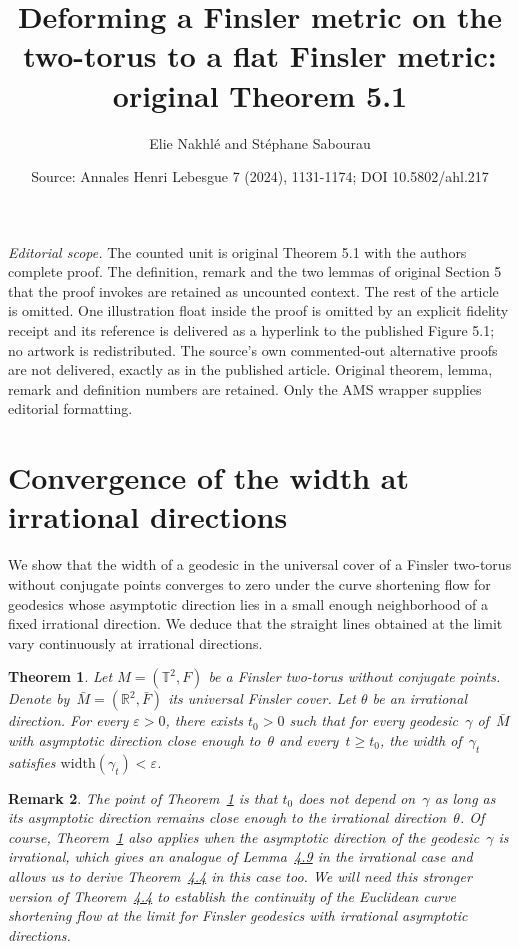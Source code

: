\documentclass[10pt,a4paper]{amsart}
\title[Uniform width convergence at irrational directions]{Deforming a Finsler metric on the two-torus to a flat Finsler metric: original Theorem 5.1}
\author{Elie Nakhlé and Stéphane Sabourau}
\date{Source: Annales Henri Lebesgue 7 (2024), 1131-1174; DOI 10.5802/ahl.217}
\numberwithin{equation}{section}
\newcommand{\R}{\mathbb{R}}
\newcommand{\T}{\mathbb{T}}
\newcommand{\width}{\mathrm{width}}
\newtheorem{theo}{Theorem}[section]
\newtheorem{rema}[theo]{Remark}
\begin{document}
\maketitle
\noindent\textit{Editorial scope.} The counted unit is original Theorem 5.1 with the authors complete proof. The definition, remark and the two lemmas of original Section 5 that the proof invokes are retained as uncounted context. The rest of the article is omitted. One illustration float inside the proof is omitted by an explicit fidelity receipt and its reference is delivered as a hyperlink to the published Figure 5.1; no artwork is redistributed. The source's own commented-out alternative proofs are not delivered, exactly as in the published article. Original theorem, lemma, remark and definition numbers are retained. Only the AMS wrapper supplies editorial formatting.
\setcounter{section}{4}
\section{Convergence of the width at irrational directions} \label{sec:uniform}


We show that the width of a geodesic in the universal cover of a Finsler two-torus without conjugate points converges to zero under the curve shortening flow for geodesics whose asymptotic direction lies in a small enough neighborhood of a fixed irrational direction. We deduce that the straight lines obtained at the limit vary continuously at irrational directions.



\begin{theo}\label{theo:unifwidth}
Let $M=(\T^2,F)$ be a Finsler two-torus without conjugate points. Denote by~$\bar{M}=(\R^2,\bar{F})$ its universal Finsler cover. Let $\theta$ be an irrational direction. For every $\varepsilon>0$, there exists $t_0>0$ such that for every geodesic~$\gamma$ of~$\bar{M}$ with asymptotic direction close enough to~$\theta$ and every~$t \geq t_0$, the width of~$\gamma_t$ satisfies $\width(\gamma_t) < \varepsilon$.
\end{theo}

\begin{rema}
The point of Theorem~\ref{theo:unifwidth} is that $t_0$ does not depend on~$\gamma$ as long as its asymptotic direction remains close enough to the irrational direction~$\theta$. Of course, Theorem~\ref{theo:unifwidth} also applies when the asymptotic direction of the geodesic~$\gamma$ is irrational, which gives an analogue of Lemma~\href{https://ahl.centre-mersenne.org/item/AHL_2024__7__1131_0/}{4.9} in the irrational case and allows us to derive Theorem~\href{https://ahl.centre-mersenne.org/item/AHL_2024__7__1131_0/}{4.4} in this case too. We will need this stronger version of Theorem~\href{https://ahl.centre-mersenne.org/item/AHL_2024__7__1131_0/}{4.4} to establish the continuity of the Euclidean curve shortening flow at the limit for Finsler geodesics with irrational asymptotic directions.
\end{rema}
\end{document}

